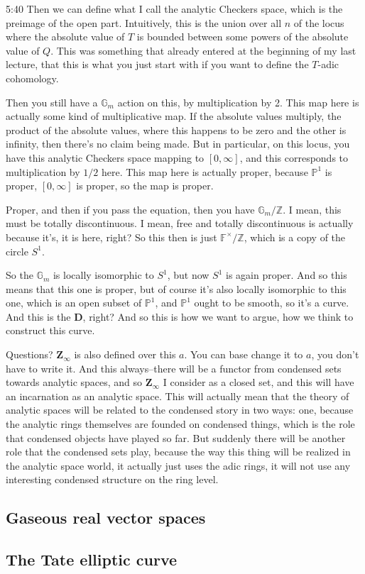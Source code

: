 \begin{unfinished}{5:40}
Then we can define what I call the analytic Checkers space, which is the preimage of the open part. Intuitively, this is the union over all $n$ of the locus where the absolute value of $T$ is bounded between some powers of the absolute value of $Q$. This was something that already entered at the beginning of my last lecture, that this is what you just start with if you want to define the $T$-adic cohomology.

Then you still have a $\mathbb{G}_m$ action on this, by multiplication by 2. This map here is actually some kind of multiplicative map. If the absolute values multiply, the product of the absolute values, where this happens to be zero and the other is infinity, then there's no claim being made. But in particular, on this locus, you have this analytic Checkers space mapping to $[0,\infty]$, and this corresponds to multiplication by $1/2$ here. This map here is actually proper, because $\mathbb{P}^1$ is proper, $[0,\infty]$ is proper, so the map is proper.

Proper, and then if you pass the equation, then you have $\mathbb{G}_m / \mathbb{Z}$. I mean, this must be totally discontinuous. I mean, free and totally discontinuous is actually because it's, it is here, right? So this then is just $\mathbb{F}^\times / \mathbb{Z}$, which is a copy of the circle $S^1$. 

So the $\mathbb{G}_m$ is locally isomorphic to $S^1$, but now $S^1$ is again proper. And so this means that this one is proper, but of course it's also locally isomorphic to this one, which is an open subset of $\mathbb{P}^1$, and $\mathbb{P}^1$ ought to be smooth, so it's a curve. And this is the $\mathbf{D}$, right? And so this is how we want to argue, how we think to construct this curve.

Questions? $\mathbf{Z}_\infty$ is also defined over this $a$. You can base change it to $a$, you don't have to write it. And this always--there will be a functor from condensed sets towards analytic spaces, and so $\mathbf{Z}_\infty$ I consider as a closed set, and this will have an incarnation as an analytic space. This will actually mean that the theory of analytic spaces will be related to the condensed story in two ways: one, because the analytic rings themselves are founded on condensed things, which is the role that condensed objects have played so far. But suddenly there will be another role that the condensed sets play, because the way this thing will be realized in the analytic space world, it actually just uses the adic rings, it will not use any interesting condensed structure on the ring level.

\end{unfinished}
\subsection{\ufs Gaseous real vector spaces}
\subsection{\ufs The Tate elliptic curve}